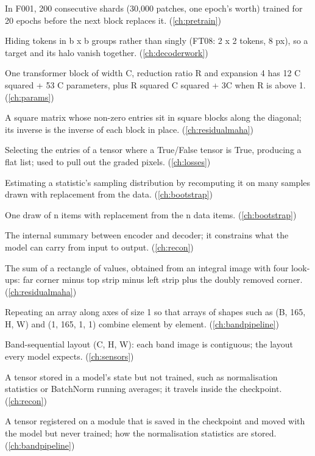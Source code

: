 \begin{description}[style=nextline,leftmargin=1.2em,font=\normalfont\bfseries]
\item[Block] In F001, 200 consecutive shards (30,000 patches, one epoch's worth) trained for 20 epochs before the next block replaces it. (\cref{ch:pretrain})
\item[Block masking] Hiding tokens in b x b groups rather than singly (FT08: 2 x 2 tokens, 8 px), so a target and its halo vanish together. (\cref{ch:decoderwork})
\item[Block parameter formula] One transformer block of width C, reduction ratio R and expansion 4 has 12 C squared + 53 C parameters, plus R squared C squared + 3C when R is above 1. (\cref{ch:params})
\item[Block-diagonal matrix] A square matrix whose non-zero entries sit in square blocks along the diagonal; its inverse is the inverse of each block in place. (\cref{ch:residualmaha})
\item[Boolean indexing] Selecting the entries of a tensor where a True/False tensor is True, producing a flat list; used to pull out the graded pixels. (\cref{ch:losses})
\item[Bootstrap] Estimating a statistic's sampling distribution by recomputing it on many samples drawn with replacement from the data. (\cref{ch:bootstrap})
\item[Bootstrap sample] One draw of n items with replacement from the n data items. (\cref{ch:bootstrap})
\item[Bottleneck] The internal summary between encoder and decoder; it constrains what the model can carry from input to output. (\cref{ch:recon})
\item[Box sum] The sum of a rectangle of values, obtained from an integral image with four look-ups: far corner minus top strip minus left strip plus the doubly removed corner. (\cref{ch:residualmaha})
\item[Broadcasting] Repeating an array along axes of size 1 so that arrays of shapes such as (B, 165, H, W) and (1, 165, 1, 1) combine element by element. (\cref{ch:bandpipeline})
\item[BSQ] Band-sequential layout (C, H, W): each band image is contiguous; the layout every model expects. (\cref{ch:sensors})
\item[Buffer] A tensor stored in a model's state but not trained, such as normalisation statistics or BatchNorm running averages; it travels inside the checkpoint. (\cref{ch:recon})
\item[Buffer (PyTorch)] A tensor registered on a module that is saved in the checkpoint and moved with the model but never trained; how the normalisation statistics are stored. (\cref{ch:bandpipeline})

\end{description}
